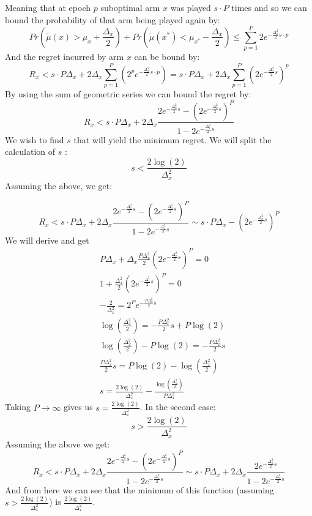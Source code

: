 \documentclass[MSc,beforeExam]{iitcsthesis}
\begin{document}
	Meaning that at epoch $p$ suboptimal arm $x$ was played $s\cdot P$ times and so we can bound the probability of that arm being played again by:
	\begin{equation}
	Pr(\tilde{\mu}(x) > \mu_{x} + \frac{\Delta_x}{2})+ 
	Pr(\tilde{\mu}(x^*)< \mu_{x^*} - \frac{\Delta_x}{2}) \leq \sum\limits_{p=1}^P 2 e^{-\frac{\Delta^2_x}{2}s\cdot p}
	\end{equation}
	And the regret incurred by arm $x$ can be bound by:
	\begin{equation}
	R_x < s\cdot P\Delta_x+2\Delta_x\sum\limits_{p=1}^P \left( 2^p e^{-\frac{\Delta^2_x}{2}s\cdot p} \right) = s\cdot P\Delta_x+2\Delta_x\sum\limits_{p=1}^P \left( 2 e^{-\frac{\Delta^2_x}{2}s} \right)^p
	\end{equation}
	By using the sum of geometric series we can bound the regret by:
	\begin{equation}
	R_x < s\cdot P\Delta_x+2\Delta_x \frac{2 e^{-\frac{\Delta^2_x}{2}s} - (2 e^{-\frac{\Delta^2_x}{2}s})^P}{1-2 e^{-\frac{\Delta^2_x}{2}s}}
	\end{equation}
	We wish to find $s$ that will yield the minimum regret.
	We will split the calculation of $s$ :	
	$$s < \frac{2\log(2)}{\Delta^2_x}$$
	Assuming the above, we get:
	
	\begin{equation}
		R_x < s\cdot P\Delta_x+2\Delta_x \frac{2 e^{-\frac{\Delta^2_x}{2}s} - (2 e^{-\frac{\Delta^2_x}{2}s})^P}{1-2 e^{-\frac{\Delta^2_x}{2}s}} \sim s\cdot P\Delta_x - (2 e^{-\frac{\Delta^2_x}{2}s})^P
	\end{equation}	
	We will derive and get
	\begin{align*}
	& P\Delta_x + \Delta_x\frac{P\Delta^2_x}{2}(2 e^{-\frac{\Delta^2_x}{2}s})^P = 0
	\\
	& 1 +\frac{\Delta^2_x}{2}(2 e^{-\frac{\Delta^2_x}{2}s})^P = 0
	\\
	& -\frac{2}{\Delta^2_x} = 2^P e^{-\frac{P\Delta^2_x}{2}s}
	\\
	& \log(\frac{\Delta^2_x}{2}) = -\frac{P\Delta^2_x}{2}s + P\log(2)
	\\
	& \log(\frac{\Delta^2_x}{2}) - P\log(2) = -\frac{P\Delta^2_x}{2}s
	\\
	& \frac{P\Delta^2_x}{2}s = P\log(2) - \log(\frac{\Delta^2_x}{2})
	\\
	& s = \frac{2\log(2)}{\Delta^2_x} - \frac{\log(\frac{\Delta^2_x}{2})}{P\Delta^2_x}
	\end{align*}
	Taking  $P\rightarrow \infty$ gives us $s = \frac{2\log(2)}{\Delta^2_x}$.
	In the second case:
	$$s > \frac{2\log(2)}{\Delta^2_x}$$
	Assuming the above we get:
	\begin{equation}
		R_x < s\cdot P\Delta_x+2\Delta_x \frac{2 e^{-\frac{\Delta^2_x}{2}s} - (2 e^{-\frac{\Delta^2_x}{2}s})^P}{1-2 e^{-\frac{\Delta^2_x}{2}s}} \sim s\cdot P\Delta_x + 2\Delta_x \frac{2 e^{-\frac{\Delta^2_x}{2}s} }{1-2 e^{-\frac{\Delta^2_x}{2}s}}
	\end{equation}
	And from here we can see that the minimum of this function (assuming $s > \frac{2\log(2)}{\Delta^2_x}$) is $\frac{2\log(2)}{\Delta^2_x}$.
\end{document}
